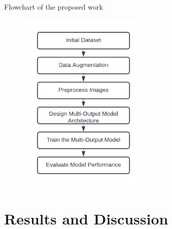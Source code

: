 \documentclass{beamer}
\begin{document}
\begin{frame}{Flowchart of the proposed work}
	\begin{figure}[!t]
		\centerline{\includegraphics[width=0.55\textwidth]{../flowchart.png}}
	\end{figure}
\end{frame}

\section[Results and Discussion]{Results and Discussion}
\end{document}

